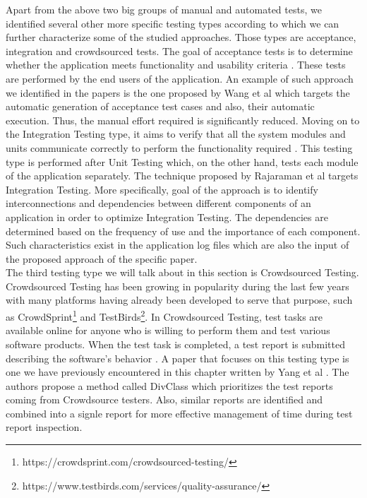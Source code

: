 Apart from the above two big groups of manual and automated tests, we identified several other more specific testing types according to which we can further characterize some of the studied approaches. Those types are 
acceptance, integration and crowdsourced tests. The goal of acceptance tests is to determine whether the application meets functionality and usability criteria \cite{artoftesting}. These tests are performed by the 
end users of the application. An example of such approach we identified in the papers is the one proposed by Wang et al \cite{wang2020automatic} which targets the automatic generation of acceptance test cases and also, 
their automatic execution. Thus, the manual effort required is significantly reduced. Moving on to the Integration Testing type, it aims to verify that all the system modules and units communicate correctly 
to perform the functionality required \cite{leung1990study}. This testing type is performed after Unit Testing which, on the other hand, tests each module of the application separately. The technique proposed by Rajaraman et 
al \cite{9197868} targets Integration Testing. More specifically, goal of the approach is to identify interconnections and dependencies between different components of an application in order to optimize Integration Testing. 
The dependencies are determined based on the frequency of use and the importance of each component. Such characteristics exist in the application log files which are also the input of the proposed approach of 
the specific paper.\\

The third testing type we will talk about in this section is Crowdsourced Testing. Crowdsourced Testing has been growing in popularity during the last few years with many platforms having already 
been developed to serve that purpose, such as CrowdSprint\footnote{https://crowdsprint.com/crowdsourced-testing/} and TestBirds\footnote{https://www.testbirds.com/services/quality-assurance/}. 
In Crowdsourced Testing, test tasks are available online for anyone who is willing to perform them and test various software products. When the test task is completed, a test report is submitted 
describing the software's behavior \cite{cui2017should}. A paper that focuses on this testing type is one we have previously encountered in this chapter written by Yang et al \cite{9617598}. The authors 
propose a method called DivClass which prioritizes the test reports coming from Crowdsource testers. Also, similar reports are identified and combined into a signle report for more effective management 
of time during test report inspection.\\

